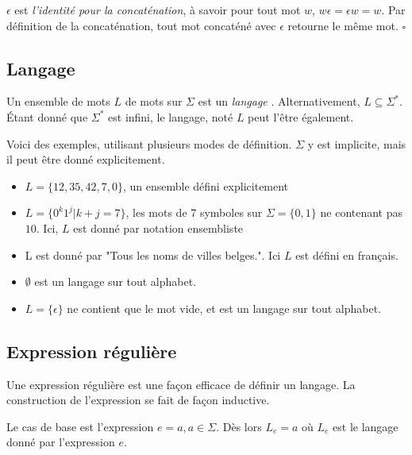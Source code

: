 \begin{lemma}
	$\epsilon$ est \emph{l'identité pour la concaténation}, à savoir pour tout mot $w$, $w\epsilon = \epsilon w = w$. Par définition de la concaténation, tout mot concaténé avec $\epsilon$ retourne le même mot. $\square$
\end{lemma}

\subsection{Langage}

Un ensemble de mots $L$ de mots sur $\Sigma$ est un \emph{langage} \cite{Hopcroft00}. Alternativement, $L \subseteq \Sigma^*$. Étant donné que $\Sigma^*$ est infini, le langage, noté $L$ peut l'être également.

\begin{exemple} Voici des exemples, utilisant plusieurs modes de définition. $\Sigma$ y est implicite, mais il peut être donné explicitement.
	\begin{itemize}
		\item $L=\{12,35,42,7,0\}$, un ensemble défini explicitement
		\item $L=\{0^k1^j|k+j=7\}$, les mots de 7 symboles sur $\Sigma=\{0,1\}$ ne contenant pas $10$. Ici, $L$ est donné par notation ensembliste
		\item L est donné par "Tous les noms de villes belges.". Ici $L$ est défini en français.
		\item $\emptyset$ est un langage sur tout alphabet.
		\item $L=\{\epsilon\}$ ne contient que le mot vide, et est un langage sur tout alphabet.
	\end{itemize}
\end{exemple}
		
\subsection{Expression régulière}

Une expression régulière est une façon efficace de définir un langage. La construction de l'expression se fait de façon inductive.
	
Le cas de base est l'expression $e = a, a \in \Sigma$. Dès lors $L_e = {a}$ où $L_e$ est le langage donné par l'expression $e$.
	
